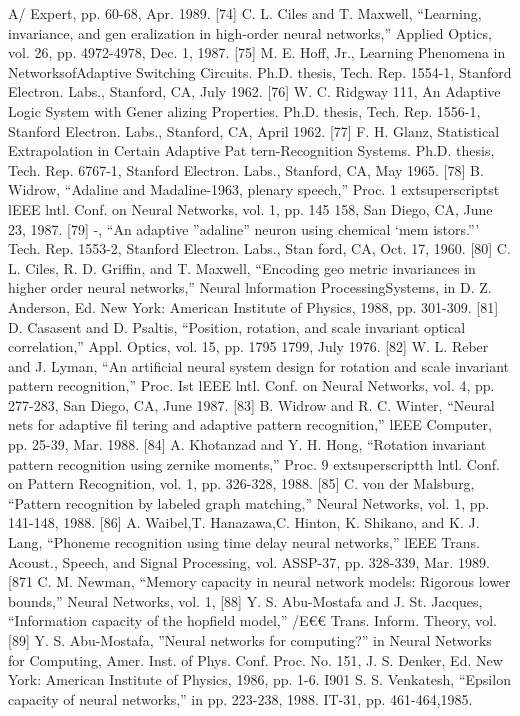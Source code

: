 \documentclass[11pt,a4paper,twocolumn]{article}
\begin{document}
{{A/ Expert, pp. 60-68, Apr. 1989. 
[74] C. L. Ciles and T. Maxwell, “Learning, invariance, and gen
eralization in high-order neural networks,” Applied Optics, 
vol. 26, pp. 4972-4978, Dec. 1, 1987. 
[75] M. E. Hoff, Jr., Learning Phenomena in NetworksofAdaptive 
Switching Circuits. Ph.D. thesis, Tech. Rep. 1554-1, Stanford 
Electron. Labs., Stanford, CA, July 1962. 
[76] W. C. Ridgway 111, An Adaptive Logic System with Gener
alizing Properties. Ph.D. thesis, Tech. Rep. 1556-1, Stanford 
Electron. Labs., Stanford, CA, April 1962. 
[77] F. H. Glanz, Statistical Extrapolation in Certain Adaptive Pat
tern-Recognition Systems. Ph.D. thesis, Tech. Rep. 
6767-1, Stanford Electron. Labs., Stanford, CA, May 1965. 
[78] B. Widrow, “Adaline and Madaline-1963, plenary speech,” 
Proc. 1	extsuperscript{st} lEEE lntl. Conf. on Neural Networks, vol. 1, pp. 145
158, San Diego, CA, June 23, 1987. 
[79] -, 
“An adaptive ”adaline” neuron using chemical ‘mem
istors.”’ Tech. Rep. 1553-2, Stanford Electron. Labs., Stan
ford, CA, Oct. 17, 1960. 
[80] C. L. Ciles, R. D. Griffin, and T. Maxwell, “Encoding geo
metric invariances in higher order neural networks,” Neural 
lnformation ProcessingSystems, in D. Z. Anderson, Ed. New 
York: American Institute of Physics, 1988, pp. 301-309. 
[81] D. Casasent and D. Psaltis, “Position, rotation, and scale 
invariant optical correlation,” Appl. Optics, vol. 15, pp. 1795
1799, July 1976. 
[82] W. L. Reber and J. Lyman, “An artificial neural system design 
for rotation and scale invariant pattern recognition,” Proc. 
Ist lEEE lntl. Conf. on Neural Networks, vol. 4, pp. 277-283, 
San Diego, CA, June 1987. 
[83] B. Widrow and R. C. Winter, “Neural nets for adaptive fil
tering and adaptive pattern recognition,” lEEE Computer, 
pp. 25-39, Mar. 1988. 
[84] A. Khotanzad and Y. H. Hong, “Rotation invariant pattern 
recognition using zernike moments,” Proc. 9	extsuperscript{th} lntl. Conf. 
on Pattern Recognition, vol. 1, pp. 326-328, 1988. 
[85] C. von der Malsburg, “Pattern recognition by labeled graph 
matching,” Neural Networks, vol. 1, pp. 141-148, 1988. 
[86] A. Waibel,T. Hanazawa,C. Hinton, K. Shikano, and K. J. Lang, 
“Phoneme recognition using time delay neural networks,” 
lEEE Trans. Acoust., Speech, and Signal Processing, vol. 
ASSP-37, pp. 328-339, Mar. 1989. 
[871 C. M. Newman, “Memory capacity in neural network 
models: Rigorous lower bounds,” Neural Networks, vol. 1, 
[88] Y. S. Abu-Mostafa and J. St. Jacques, “Information capacity 
of the hopfield model,” /E€€ Trans. Inform. Theory, vol. 
[89] Y. S. Abu-Mostafa, ”Neural networks for computing?” in 
Neural Networks for Computing, Amer. Inst. of Phys. Conf. 
Proc. No. 151, J. S. Denker, Ed. New York: American Institute 
of Physics, 1986, pp. 1-6. 
I901 S. S. Venkatesh, “Epsilon capacity of neural networks,” in 
pp. 223-238, 1988. 
IT-31, pp. 461-464,1985. 






}}
\end{document}
